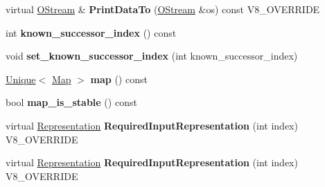 \begin{DoxyCompactItemize}
\item 
\hypertarget{classv8_1_1internal_1_1_v8___f_i_n_a_l_ac450dad970b14246be761ccf5004924b}{}virtual \hyperlink{classv8_1_1internal_1_1_o_stream}{O\+Stream} \& {\bfseries Print\+Data\+To} (\hyperlink{classv8_1_1internal_1_1_o_stream}{O\+Stream} \&os) const V8\+\_\+\+O\+V\+E\+R\+R\+I\+D\+E\label{classv8_1_1internal_1_1_v8___f_i_n_a_l_ac450dad970b14246be761ccf5004924b}

\item 
\hypertarget{classv8_1_1internal_1_1_v8___f_i_n_a_l_a0d29bbcf87f0d2ce8a36de5a25f5a129}{}int {\bfseries known\+\_\+successor\+\_\+index} () const \label{classv8_1_1internal_1_1_v8___f_i_n_a_l_a0d29bbcf87f0d2ce8a36de5a25f5a129}

\item 
\hypertarget{classv8_1_1internal_1_1_v8___f_i_n_a_l_a872a819ac2bb8a80448280f8adc52552}{}void {\bfseries set\+\_\+known\+\_\+successor\+\_\+index} (int known\+\_\+successor\+\_\+index)\label{classv8_1_1internal_1_1_v8___f_i_n_a_l_a872a819ac2bb8a80448280f8adc52552}

\item 
\hypertarget{classv8_1_1internal_1_1_v8___f_i_n_a_l_a5ce1597ebaae8b7d1dd77ca10e231c23}{}\hyperlink{classv8_1_1internal_1_1_unique}{Unique}$<$ \hyperlink{classv8_1_1internal_1_1_map}{Map} $>$ {\bfseries map} () const \label{classv8_1_1internal_1_1_v8___f_i_n_a_l_a5ce1597ebaae8b7d1dd77ca10e231c23}

\item 
\hypertarget{classv8_1_1internal_1_1_v8___f_i_n_a_l_a6661372d6849c54a8fa59ba651059396}{}bool {\bfseries map\+\_\+is\+\_\+stable} () const \label{classv8_1_1internal_1_1_v8___f_i_n_a_l_a6661372d6849c54a8fa59ba651059396}

\item 
\hypertarget{classv8_1_1internal_1_1_v8___f_i_n_a_l_a6c6d1f37f40b113d8f4062f1ffff7215}{}virtual \hyperlink{classv8_1_1internal_1_1_representation}{Representation} {\bfseries Required\+Input\+Representation} (int index) V8\+\_\+\+O\+V\+E\+R\+R\+I\+D\+E\label{classv8_1_1internal_1_1_v8___f_i_n_a_l_a6c6d1f37f40b113d8f4062f1ffff7215}

\item 
\hypertarget{classv8_1_1internal_1_1_v8___f_i_n_a_l_a6c6d1f37f40b113d8f4062f1ffff7215}{}virtual \hyperlink{classv8_1_1internal_1_1_representation}{Representation} {\bfseries Required\+Input\+Representation} (int index) V8\+\_\+\+O\+V\+E\+R\+R\+I\+D\+E\label{classv8_1_1internal_1_1_v8___f_i_n_a_l_a6c6d1f37f40b113d8f4062f1ffff7215}


\end{DoxyCompactItemize}
